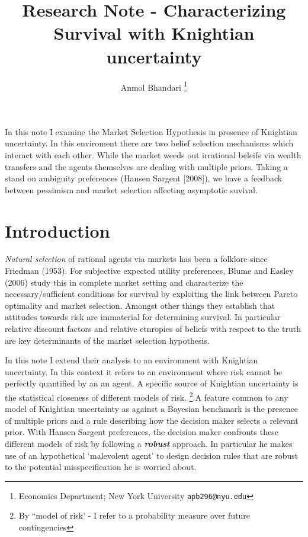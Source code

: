 \documentclass[12pt]{article}
\begin{document}
\title{Research Note  - Characterizing Survival with Knightian uncertainty}
\author{Anmol Bhandari \thanks{Economics Department; New York University \texttt{apb296@nyu.edu}}}
\maketitle
In this note I examine the Market Selection Hypothesis in presence of Knightian uncertainty. In this enviroment there are two belief selection mechanisms which interact with each other. While the market weeds out irrational beleifs via wealth transfers and the agents themselves are dealing with multiple priors. Taking a stand on ambiguity preferences (Hansen Sargent [2008]), we have a feedback between pessimism and market selection affecting asymptotic suvival. 
\newpage

\section{Introduction}
\noindent \emph{Natural selection} of rational agents via markets has been a folklore since Friedman (1953). For subjective expected utility preferences, Blume and Easley (2006) study this in complete market setting and characterize the necessary/sufficient conditions for survival by exploiting the link between Pareto optimality and market selection. Amongst other things they establish that attitudes towards risk are immaterial for determining survival. In particular relative discount factors and relative etnropies of beliefs with respect to the truth are key determinants of the market selection hypothesis. 

\noindent In this note I extend their analysis to an environment with Knightian uncertainty. In this context it refers to an environment where risk cannot be perfectly quantified by an an agent. A specific source of Knightian uncertainty is the statistical closeness of different models of risk. \footnote{By ``model of risk' - I refer to a probability measure over future contingencies}.A feature common to any model of Knightian uncertainty as against a Bayesian benchmark is the presence of multiple priors and a rule describing how the decision maker selects a relevant prior. With Hansen Sargent preferences, the decision maker confronts these different models of risk by following a \textbf{\emph{robust}} approach. In particular he makes use of an hypothetical `malevolent agent' to design decision rules that are robust to the potential misspecification he is worried about. 
\end{document}
